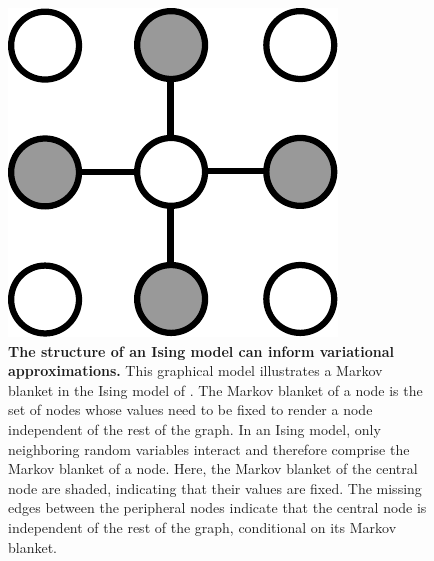 \begin{figure}[t]
  \centering
  \includegraphics[height=0.2\paperheight]{fig/ising-markov-blanket.pdf}
  \caption[Markov blanket of a node in an Ising model]{
  \textbf{The structure of an Ising model can inform variational approximations.} This graphical model illustrates a Markov blanket in the Ising model of . The Markov blanket of a node is the set of nodes whose values need to be fixed to render a node independent of the rest of the graph. In an Ising model, only neighboring random variables interact and therefore comprise the Markov blanket of a node. Here, the Markov blanket of the central node are shaded, indicating that their values are fixed. The missing edges between the peripheral nodes indicate that the central node is independent of the rest of the graph, conditional on its Markov blanket.}
  \label{fig:ising-markov-blanket}
\end{figure}